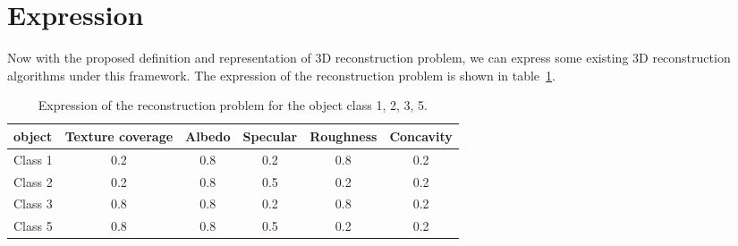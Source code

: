 \section{Expression}
\label{sec:3DRecon_Exp}
Now with the proposed definition and representation of 3D reconstruction problem, we can express some existing 3D reconstruction algorithms under this framework. The expression of the reconstruction problem is shown in table~\ref{tab:express}.
\begin{table}[h]
  \centering
  \begin{tabular}{l*{5}{c}}
  \hline
  \textbf{object} & Texture coverage & Albedo & Specular & Roughness & Concavity\\
  \hline
  Class 1 & 0.2 & 0.8 & 0.2 & 0.8 & 0.2\\
  Class 2 & 0.2 & 0.8 & 0.5 & 0.2 & 0.2\\
  Class 3 & 0.8 & 0.8 & 0.2 & 0.8 & 0.2\\
  Class 5 & 0.8 & 0.8 & 0.5 & 0.2 & 0.2\\
  \hline
  \end{tabular}
  \caption{Expression of the reconstruction problem for the object class 1, 2, 3, 5.}
  \label{tab:express}
\end{table}